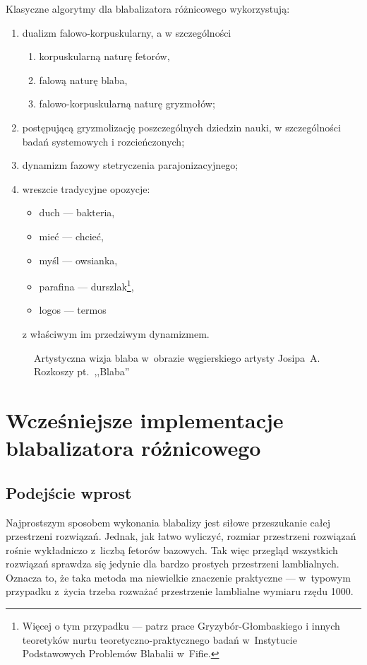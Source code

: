 \documentclass[licencjacka,en]{pracamgr}
\begin{document}
Klasyczne algorytmy dla blabalizatora różnicowego wykorzystują:
\begin{enumerate}
\item dualizm falowo-korpuskularny, a w szczególności
  \begin{enumerate}
  \item korpuskularną naturę fetorów,
  \item falową naturę blaba,
  \item falowo-korpuskularną naturę gryzmołów;
  \end{enumerate}
\item postępującą gryzmolizację poszczególnych dziedzin nauki, w
  szczególności badań systemowych i rozcieńczonych;
\item dynamizm fazowy stetryczenia parajonizacyjnego;
\item wreszcie tradycyjne opozycje:
  \begin{itemize}
  \item duch --- bakteria,
  \item mieć --- chcieć,
  \item myśl --- owsianka,
  \item parafina --- durszlak\footnote{Więcej o tym przypadku --- patrz
      prace Gryzybór-Głombaskiego i innych teoretyków nurtu
      teoretyczno-praktycznego badań w~Instytucie Podstawowych
      Problemów Blabalii w~Fifie.},
  \item logos --- termos%
  \end{itemize}
  z właściwym im przedziwym dynamizmem.
\end{enumerate}

\begin{figure}[tp]
  \centering
  \caption{Artystyczna wizja blaba w~obrazie węgierskiego artysty
    Josipa~A. Rozkoszy pt.~,,Blaba''}
\end{figure}

\chapter{Wcześniejsze implementacje blabalizatora
  różnicowego}\label{r:losers}

\section{Podejście wprost}

Najprostszym sposobem wykonania blabalizy jest siłowe przeszukanie
całej przestrzeni rozwiązań.  Jednak, jak łatwo wyliczyć, rozmiar
przestrzeni rozwiązań rośnie wykładniczo z~liczbą fetorów bazowych.
Tak więc przegląd wszystkich rozwiązań sprawdza się jedynie dla bardzo
prostych przestrzeni lamblialnych.  Oznacza to, że taka metoda ma
niewielkie znaczenie praktyczne --- w~typowym przypadku z~życia trzeba
rozważać przestrzenie lamblialne wymiaru rzędu 1000.
\end{document}
